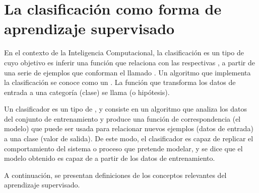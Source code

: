 %
%
%
\section{La clasificación como forma de aprendizaje supervisado}
%
En el contexto de la Inteligencia Computacional, la clasificación es
un tipo de  cuyo objetivo es
{inferir} una función que relaciona  con las
respectivas , a partir de una serie de ejemplos que
conforman el llamado .
Un algoritmo que implementa la clasificación se conoce como un
.
La función que transforma los datos de entrada a una categoría
(clase) se llama  (o {hipótesis}).

Un clasificador es un tipo de , y consiste
en un algoritmo que analiza los datos del conjunto de entrenamiento
y produce una función de correspondencia (el modelo) que puede ser
usada para relacionar nuevos ejemplos (datos de entrada) a una clase
(valor de salida).
De este modo, el clasificador es capaz de replicar el comportamiento
del sistema o proceso que pretende modelar, y se dice que el modelo
obtenido es capaz de  a partir de los datos de
entrenamiento.

A continuación, se presentan definiciones de los conceptos
relevantes del aprendizaje supervisado.
